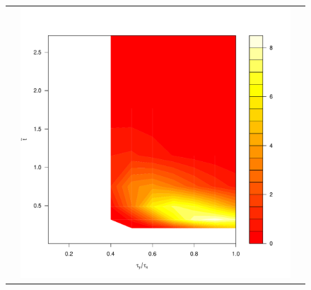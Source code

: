 \documentclass[10pt]{article}
\begin{document}
\begin{enumerate}
\begin{figure}
\begin{tabular}{ccc}
\begin{minipage}{0.33\textwidth}
    \end{minipage}
    & \begin{minipage}{0.33\textwidth}
      \centering
      \includegraphics[width=1\linewidth]{small-t-Galerkin-no-filter.pdf}
    \end{minipage}
  \end{tabular}
  \caption{}
  \label{fig:small-t-sol}
\end{figure}


\end{enumerate}
\end{document}
